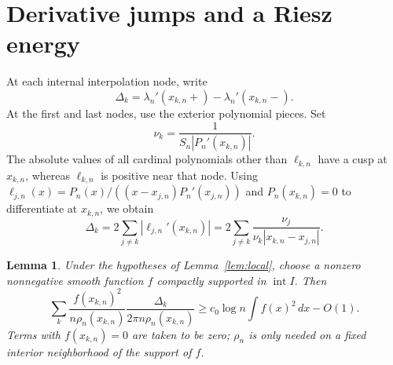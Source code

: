 \documentclass[11pt]{article}
\newtheorem{lemma}[theorem]{Lemma}
\theoremstyle{remark}
\numberwithin{equation}{section}
\begin{document}
\section{Derivative jumps and a Riesz energy}\label{sec:energy}

At each internal interpolation node, write
\[
 \Delta_k=\lambda_n'(x_{k,n}+)-\lambda_n'(x_{k,n}-).
\]
At the first and last nodes, use the exterior polynomial pieces. Set
\[
 \nu_k=\frac1{S_n|P_n'(x_{k,n})|}.
\]
The absolute values of all cardinal polynomials other than \(\ell_{k,n}\) have
a cusp at \(x_{k,n}\), whereas \(\ell_{k,n}\) is positive near that node.
Using \(\ell_{j,n}(x)=P_n(x)/((x-x_{j,n})P_n'(x_{j,n}))\) and
\(P_n(x_{k,n})=0\) to differentiate at \(x_{k,n}\), we obtain
\begin{equation}\label{eq:jump}
 \Delta_k=2\sum_{j\ne k}|\ell_{j,n}'(x_{k,n})|
     =2\sum_{j\ne k}\frac{\nu_j}{\nu_k|x_{k,n}-x_{j,n}|}.
\end{equation}

\begin{lemma}\label{lem:energy}
Under the hypotheses of Lemma~\ref{lem:local}, choose a nonzero nonnegative
smooth function \(f\) compactly supported in \(\operatorname{int}I\). Then
\begin{equation}\label{eq:jump-average}
 \sum_k\frac{f(x_{k,n})^2}{n\rho_n(x_{k,n})}
       \frac{\Delta_k}{2\pi n\rho_n(x_{k,n})}
 \ge c_0\log n\int f(x)^2\,dx-O(1).
\end{equation}
Terms with \(f(x_{k,n})=0\) are taken to be zero; \(\rho_n\) is only needed on
a fixed interior neighborhood of the support of \(f\).

\end{lemma}
\end{document}
